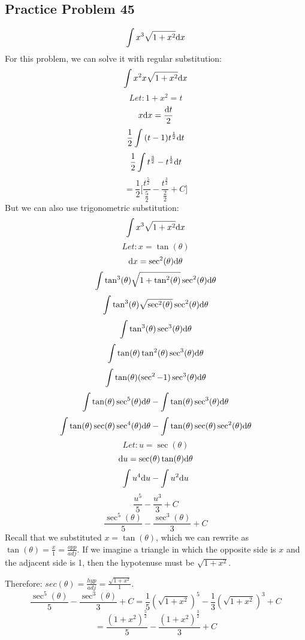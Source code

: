 \documentclass[letterpaper, 12pt]{math}
\begin{document}
\subsection*{Practice Problem 45}
\[ \int{x^{3}\sqrt{1+x^{2}}\mathrm{d}{x}} \]
For this problem, we can solve it with regular substitution:
\[ \int{x^{2}x\sqrt{1+x^{2}}\mathrm{d}{x}} \]
\[ Let: 1+x^{2} = t \]
\[ x\mathrm{d}{x} = \frac{\mathrm{d}{t}}{2} \]
\[ \frac{1}{2}\int{(t-1)t^{\frac{1}{2}}\mathrm{d}{t}} \]
\[ \frac{1}{2}\int{t^{\frac{3}{2}}-t^{\frac{1}{2}}\mathrm{d}{t}} \]
\[ = \frac{1}{2}\bigg[\frac{t^{\frac{5}{2}}}{\frac{5}{2}}-
     \frac{t^{\frac{3}{2}}}{\frac{2}{2}}+C\bigg] \]
But we can also use trigonometric substitution:
\[ \int{x^{3}\sqrt{1+x^{2}}\mathrm{d}{x}} \]
\[ Let: x = \tan(\theta) \]
\[ \mathrm{d}{x} = \sec^{2}(\theta)\mathrm{d}{\theta} \]
\[ \int{\tan^{3}(\theta)\sqrt{1+\tan^{2}(\theta)}
   \sec^{2}(\theta)\mathrm{d}{\theta}} \]
\[ \int{\tan^{3}(\theta)\sqrt{\sec^{2}(\theta)}
   \sec^{2}(\theta)\mathrm{d}{\theta}} \]
\[ \int{\tan^{3}(\theta)\sec^{3}(\theta)\mathrm{d}{\theta}} \]
\[ \int{\tan(\theta)\tan^{2}(\theta)\sec^{3}(\theta)\mathrm{d}{\theta}} \]
\[ \int{\tan(\theta)(\sec^{2}-1)\sec^{3}(\theta)\mathrm{d}{\theta}} \]
\[ \int{\tan(\theta)\sec^{5}(\theta)\mathrm{d}{\theta}}-
   \int{\tan(\theta)\sec^{3}(\theta)\mathrm{d}{\theta}} \]
\[ \int{\tan(\theta)\sec(\theta)\sec^{4}(\theta)\mathrm{d}{\theta}}-
   \int{\tan(\theta)\sec(\theta)\sec^{2}(\theta)\mathrm{d}{\theta}} \]
\[ Let: u = \sec(\theta) \]
\[ \mathrm{d}{u} = \sec(\theta)\tan(\theta)\mathrm{d}{\theta} \]
\[ \int{u^{4}\mathrm{d}{u}}- \int{u^{2}\mathrm{d}{u}} \]
\[ \frac{u^{5}}{5}-\frac{u^{3}}{3}+C \]
\[ \frac{\sec^{5}(\theta)}{5}-\frac{\sec^{3}(\theta)}{3}+C \]
Recall that we substituted \( x = \tan(\theta) \), which we can rewrite as
\( \tan(\theta) = \frac{x}{1} = \frac{opp}{adj} \). If we imagine a triangle in
which the opposite side is \( x \) and the adjacent side is 1, then the
hypotenuse must be \( \sqrt{1+x^{2}} \).
\begin{center}
\end{center}
Therefore: \( sec(\theta) = \frac{hyp}{adj} = \frac{\sqrt{1+x^{2}}}{1} \).
\[ \frac{\sec^{5}(\theta)}{5}-\frac{\sec^{3}(\theta)}{3}+C =
   \frac{1}{5}(\sqrt{1+x^{2}})^{5}-\frac{1}{3}(\sqrt{1+x^{2}})^{3}+C \]
\[ = \frac{(1+x^{2})^{\frac{5}{2}}}{5}-\frac{(1+x^{2})^{\frac{3}{2}}}{3}+C \]
\end{document}
